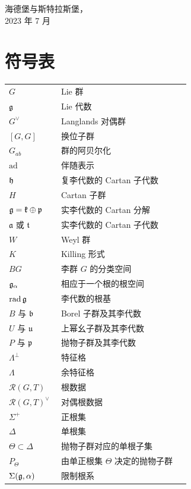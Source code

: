 \begin{flushright}
海德堡与斯特拉斯堡，\\[2pt]
2023 年 7 月
\end{flushright}

\chapter*{符号表}

\small
\begin{longtable}{@{}p{0.27\linewidth}p{0.67\linewidth}@{}}
$G$ & Lie 群 \\
$\mathfrak{g}$ & Lie 代数 \\
$G^{\vee}$ & Langlands 对偶群 \\
$[G,G]$ & 换位子群 \\
$G_{ab}$ & 群的阿贝尔化 \\
$\mathrm{ad}$ & 伴随表示 \\
$\mathfrak{h}$ & 复李代数的 Cartan 子代数 \\
$H$ & Cartan 子群 \\
$\mathfrak{g}=\mathfrak{k}\oplus\mathfrak{p}$ & 实李代数的 Cartan 分解 \\
$\mathfrak{a}$ 或 $\mathfrak{t}$ & 实李代数的 Cartan 子代数 \\
$W$ & Weyl 群 \\
$K$ & Killing 形式 \\
$BG$ & 李群 $G$ 的分类空间 \\
$\mathfrak{g}_\alpha$ & 相应于一个根的根空间 \\
$\operatorname{rad}\mathfrak{g}$ & 李代数的根基 \\
$B$ 与 $\mathfrak{b}$ & Borel 子群及其李代数 \\
$U$ 与 $\mathfrak{u}$ & 上幂幺子群及其李代数 \\
$P$ 与 $\mathfrak{p}$ & 抛物子群及其李代数 \\
$\Lambda^{\perp}$ & 特征格 \\
$\Lambda$ & 余特征格 \\
$\mathcal{R}(G,T)$ & 根数据 \\
$\mathcal{R}(G,T)^{\vee}$ & 对偶根数据 \\
$\Sigma^{+}$ & 正根集 \\
$\Delta$ & 单根集 \\
$\Theta\subset\Delta$ & 抛物子群对应的单根子集 \\
$P_\Theta$ & 由单正根集 $\Theta$ 决定的抛物子群 \\
$\Sigma(\mathfrak{g},\alpha)$ & 限制根系 \\

\end{longtable}
